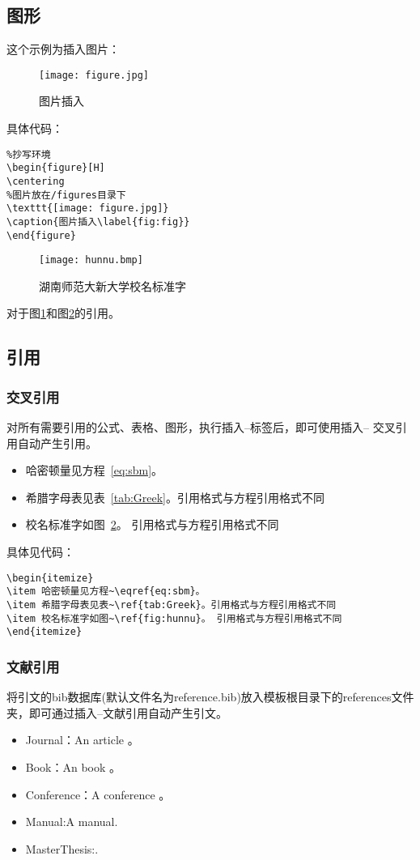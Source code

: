 \subsection{图形}
这个示例为插入图片：
\begin{figure}[H]
	\centering
		\texttt{[image: figure.jpg]}%
	\caption{图片插入\label{fig:fig}}
\end{figure}
具体代码：
\begin{verbatim}%抄写环境
\begin{figure}[H]
\centering
%图片放在/figures目录下
\texttt{[image: figure.jpg]}
\caption{图片插入\label{fig:fig}}
\end{figure}
\end{verbatim}
\begin{figure}[H]
\centering
		\texttt{[image: hunnu.bmp]}
\caption{湖南师范大新大学校名标准字\label{fig:hunnu}}
\end{figure}
对于图\ref{fig:fig}和图\ref{fig:hunnu}的引用。
\subsection{引用}
\subsubsection{交叉引用}
对所有需要引用的公式、表格、图形，执行插入--标签后，即可使用插入-- 交叉引用自动产生引用。
\begin{itemize}
\item 哈密顿量见方程~\eqref{eq:sbm}。
\item 希腊字母表见表~\ref{tab:Greek}。引用格式与方程引用格式不同
\item 校名标准字如图~\ref{fig:hunnu}。 引用格式与方程引用格式不同
\end{itemize}
具体见代码：
\begin{verbatim}
\begin{itemize}
\item 哈密顿量见方程~\eqref{eq:sbm}。
\item 希腊字母表见表~\ref{tab:Greek}。引用格式与方程引用格式不同
\item 校名标准字如图~\ref{fig:hunnu}。 引用格式与方程引用格式不同
\end{itemize}
\end{verbatim}
\subsubsection{文献引用}
将引文的bib数据库(默认文件名为reference.bib)放入模板根目录下的references文件夹，即可通过插入--文献引用自动产生引文。
\begin{itemize}
\item Journal：An article 。
\item Book：An book \cite{IEEE-1363,tex,companion}。
\item Conference：A conference \cite{kocher99,DPMG,cnproceed}。
\item Manual:A manual\cite{NPB2}.
\item MasterThesis:\cite{zhubajie,metamori2004,shaheshang,FistSystem01}.
\end{itemize}
